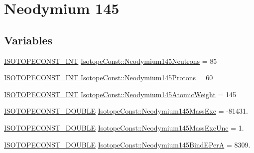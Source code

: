 \hypertarget{group___isotope_const-_neodymium-_nd145}{}\section{Neodymium 145}
\label{group___isotope_const-_neodymium-_nd145}
\subsection*{Variables}
\begin{DoxyCompactItemize}
\item 
\mbox{\hyperlink{group___isotope_const-_macros_ga5f18360b3e99483a35c32d789e62621c}{I\+S\+O\+T\+O\+P\+E\+C\+O\+N\+S\+T\+\_\+\+I\+NT}} \mbox{\hyperlink{group___isotope_const-_neodymium-_nd145_ga939a2541d932c9df5996ea246e54b56e}{Isotope\+Const\+::\+Neodymium145\+Neutrons}} = 85
\item 
\mbox{\hyperlink{group___isotope_const-_macros_ga5f18360b3e99483a35c32d789e62621c}{I\+S\+O\+T\+O\+P\+E\+C\+O\+N\+S\+T\+\_\+\+I\+NT}} \mbox{\hyperlink{group___isotope_const-_neodymium-_nd145_gab250a277978af74e1ab415060c4a15f7}{Isotope\+Const\+::\+Neodymium145\+Protons}} = 60
\item 
\mbox{\hyperlink{group___isotope_const-_macros_ga5f18360b3e99483a35c32d789e62621c}{I\+S\+O\+T\+O\+P\+E\+C\+O\+N\+S\+T\+\_\+\+I\+NT}} \mbox{\hyperlink{group___isotope_const-_neodymium-_nd145_gae03c9ffa05d41faf858c2f26e27a302d}{Isotope\+Const\+::\+Neodymium145\+Atomic\+Weight}} = 145
\item 
\mbox{\hyperlink{group___isotope_const-_macros_ga8f45a7272ce02c0b4c65c44636ed719a}{I\+S\+O\+T\+O\+P\+E\+C\+O\+N\+S\+T\+\_\+\+D\+O\+U\+B\+LE}} \mbox{\hyperlink{group___isotope_const-_neodymium-_nd145_ga263ff4abf6090e6b138b972880d0a202}{Isotope\+Const\+::\+Neodymium145\+Mass\+Exc}} = -\/81431.
\item 
\mbox{\hyperlink{group___isotope_const-_macros_ga8f45a7272ce02c0b4c65c44636ed719a}{I\+S\+O\+T\+O\+P\+E\+C\+O\+N\+S\+T\+\_\+\+D\+O\+U\+B\+LE}} \mbox{\hyperlink{group___isotope_const-_neodymium-_nd145_ga28527dbc444558cd5ea41e02cc759d25}{Isotope\+Const\+::\+Neodymium145\+Mass\+Exc\+Unc}} = 1.
\item 
\mbox{\hyperlink{group___isotope_const-_macros_ga8f45a7272ce02c0b4c65c44636ed719a}{I\+S\+O\+T\+O\+P\+E\+C\+O\+N\+S\+T\+\_\+\+D\+O\+U\+B\+LE}} \mbox{\hyperlink{group___isotope_const-_neodymium-_nd145_ga5abbd5d8128280b7f04db7930ea42b11}{Isotope\+Const\+::\+Neodymium145\+Bind\+E\+PerA}} = 8309.
\item 

\end{DoxyCompactItemize}
